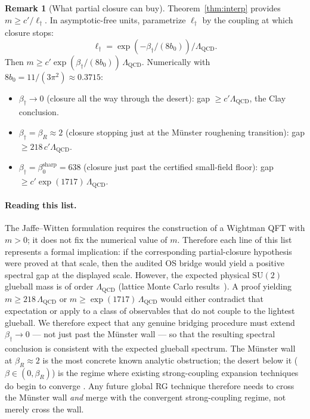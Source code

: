 \documentclass[11pt]{article}
\theoremstyle{definition}
\newtheorem{remark}[theorem]{Remark}
\newcommand{\SU}{\mathrm{SU}}
\newcommand{\Lam}{\Lambda_{\mathrm{QCD}}}
\begin{document}
\begin{remark}[What partial closure can buy]
\label{rem:partial-closure-buys}
Theorem~\ref{thm:interp} provides $m\ge c'/\ell_\dagger$.  In
asymptotic-free units, parametrize $\ell_\dagger$ by the coupling at
which closure stops:
\[
\ell_\dagger = \exp(-\beta_\dagger/(8b_0))/\Lam.
\]
Then $m \ge c' \exp(\beta_\dagger/(8b_0))\,\Lam$.  Numerically with
$8b_0 = 11/(3\pi^2) \approx 0.3715$:
\begin{itemize}[nosep]
\item $\beta_\dagger \to 0$ \textup{(}closure all the way through
the desert\textup{)}: gap $\ge c'\Lam$, the Clay conclusion.
\item $\beta_\dagger = \beta_R \approx 2$ \textup{(}closure stopping
just at the M\"unster roughening transition\textup{)}: gap
$\ge 218\,c'\Lam$.
\item $\beta_\dagger = \beta_0^{\mathrm{sharp}} = 638$ \textup{(}closure
just past the certified small-field floor\textup{)}: gap
$\ge c'\exp(1717)\,\Lam$.
\end{itemize}

\paragraph{Reading this list.}  The Jaffe--Witten formulation requires
the construction of a Wightman QFT with $m > 0$; it does not fix the
numerical value of $m$.  Therefore each line of this list represents a formal implication: if the corresponding partial-closure hypothesis were proved at that scale, then the audited OS bridge would yield a positive spectral gap at the displayed scale.  However, the expected physical $\SU(2)$
glueball mass is of order $\Lam$ \textup{(}lattice Monte Carlo
results~\cite{Creutz80}\textup{)}.  A proof yielding
$m\ge 218\,\Lam$ or $m\ge\exp(1717)\,\Lam$ would either contradict
that expectation or apply to a class of observables that do not
couple to the lightest glueball.  We therefore expect that any
genuine bridging procedure must extend $\beta_\dagger\to 0$ --- not
just past the M\"unster wall --- so that the resulting spectral
conclusion is consistent with the expected glueball spectrum.  The
M\"unster wall at $\beta_R\approx 2$ is the most concrete known
analytic obstruction; the desert below it
($\beta\in(0,\beta_R)$) is the regime where existing strong-coupling
expansion techniques do begin to converge \cite{SZZ22, CNS25}.  Any
future global RG technique therefore needs to cross the M\"unster
wall \emph{and} merge with the convergent strong-coupling regime, not
merely cross the wall.


\end{remark}
\end{document}
